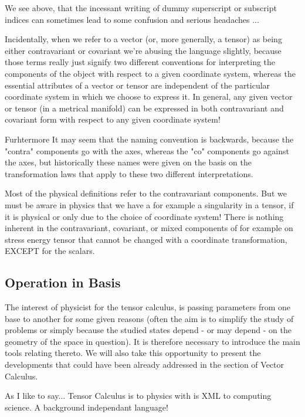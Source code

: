 	\begin{tcolorbox}[title=Remark,colframe=black,arc=10pt]
	We see above, that the incessant writing  of dummy superscript or subscript indices  can sometimes lead to some confusion and serious headaches ...
	\end{tcolorbox}
	Incidentally, when we refer to a vector (or, more generally, a tensor) as being either contravariant or covariant we're abusing the language slightly, because those terms really just signify two different conventions for interpreting the components of the object with respect to a given coordinate system, whereas the essential attributes of a vector or tensor are independent of the particular coordinate system in which we choose to express it. In general, any given vector or tensor (in a metrical manifold) can be expressed in both contravariant and covariant form with respect to any given coordinate system!
	
	Furhtermore It may seem that the naming convention is backwards, because the "contra" components go with the axes, whereas the "co" components go against the axes, but historically these names were given on the basis on the transformation laws that apply to these two different interpretations.
	
	Most of the physical definitions refer to the contravariant components. But we must be aware in physics that we have a for example a singularity in a tensor, if it is physical or only due to the choice of coordinate system! There is nothing inherent in the contravariant, covariant, or mixed components of for example on stress energy tensor that cannot be changed with a coordinate transformation, EXCEPT for the scalars. 
	
	\pagebreak
	\subsection{Operation in Basis}
	The interest of physicist for the tensor calculus, is passing parameters from one base to another for some given reasons (often the aim is to simplify the study of problems or simply because the studied states depend - or may depend - on the geometry of the space in question). It is therefore necessary to introduce the main tools relating thereto. We will also take this opportunity to present the developments that could have been already addressed in the section of Vector Calculus.
	\begin{tcolorbox}[title=Remark,colframe=black,arc=10pt]
	As I like to say... Tensor Calculus is to physics with is XML to computing science. A background independant language!
	\end{tcolorbox}
	
